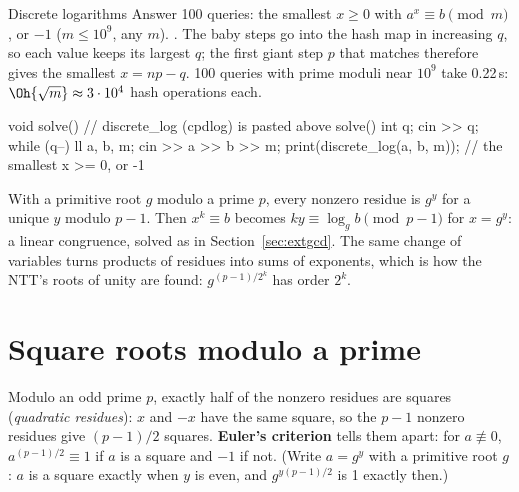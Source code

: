 
\begin{problem}{Discrete logarithms}
Answer 100 queries: the smallest $x \ge 0$ with $a^x \equiv b \pmod m$, or $-1$ ($m \le 10^9$, any $m$).
\solution {}. The baby steps go into the hash map in increasing $q$, so each value keeps its largest $q$; the first
giant step $p$ that matches therefore gives the smallest $x = np - q$. 100 queries with prime moduli near $10^9$ take 0.22\,s:
$\Oh{\sqrt m} \approx 3 \cdot 10^4$ hash operations each.
\end{problem}

\begin{code}
void solve() {  // discrete_log (cpdlog) is pasted above solve()
    int q;
    cin >> q;
    while (q--) {
        ll a, b, m;
        cin >> a >> b >> m;
        print(discrete_log(a, b, m));  // the smallest x >= 0, or -1
    }
}
\end{code}

\begin{trick}
With a primitive root $g$ modulo a prime $p$, every nonzero residue is $g^y$ for a unique $y$ modulo $p - 1$. Then $x^k \equiv b$
becomes $k y \equiv \log_g b \pmod{p - 1}$ for $x = g^y$: a linear congruence, solved as in Section~\ref{sec:extgcd}. The same change of
variables turns products of residues into sums of exponents, which is how the NTT's roots of unity are found:
$g^{(p-1)/2^k}$ has order $2^k$.
\end{trick}

\section[Square roots modulo a prime]{Square roots modulo a prime \hfill \ioi}\label{sec:sqrtmod}

Modulo an odd prime $p$, exactly half of the nonzero residues are squares (\emph{quadratic residues}): $x$ and $-x$ have the same
square, so the $p - 1$ nonzero residues give $(p - 1)/2$ squares. \textbf{Euler's criterion} tells them apart: for $a \not\equiv 0$,
$a^{(p-1)/2} \equiv 1$ if $a$ is a square and $-1$ if not. (Write $a = g^y$ with a primitive root $g$: $a$ is a square exactly when $y$
is even, and $g^{y (p-1)/2}$ is 1 exactly then.)

